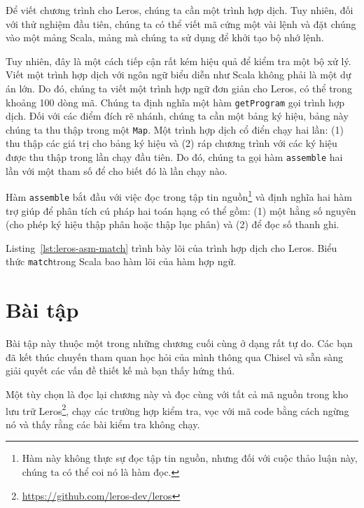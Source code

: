 \documentclass[%
    10pt,
    headinclude, footexclude,
    openright, %
    notitlepage,
    cleardoubleempty,
    headsepline,
    pointlessnumbers,
    bibtotoc, idxtotoc,
    ]{scrbook}
\newcommand{\code}[1]{{\small{\texttt{#1}}}}
\newcommand{\todo}[1]{{\emph{TODO: #1}}}
\newcommand{\myref}[2]{\href{#1}{#2}}
\renewcommand{\myref}[2]{{#2}{\footnote{\url{#1}}}}
\renewcommand{\todo}[1]{}
\begin{document}

Để viết chương trình cho Leros, chúng ta cần một trình hợp dịch. Tuy nhiên, đối với thử nghiệm đầu tiên, chúng ta có thể viết mã cứng một vài lệnh và đặt chúng vào một mảng Scala, mảng mà chúng ta sử dụng để khởi tạo bộ nhớ lệnh. 


\noindent Tuy nhiên, đây là một cách tiếp cận rất kém hiệu quả để kiểm tra một bộ xử lý. Viết một trình hợp dịch với ngôn ngữ biểu diễn như Scala không phải là một dự án lớn. Do đó, chúng ta viết một trình hợp ngữ đơn giản cho Leros, có thể trong khoảng 100 dòng mã. Chúng ta định nghĩa một hàm \code{getProgram} gọi trình hợp dịch. Đối với các điểm đích rẽ nhánh, chúng ta cần một bảng ký hiệu, bảng này chúng ta thu thập trong một \code{Map}. Một trình hợp dịch cổ điển chạy hai lần: (1) thu thập các giá trị cho bảng ký hiệu và (2) ráp chương trình với các ký hiệu được thu thập trong lần chạy đầu tiên. Do đó, chúng ta gọi hàm \code{assemble} hai lần với một tham số để cho biết đó là lần chạy nào. 


Hàm \code{assemble} bắt đầu với việc đọc trong tập tin nguồn\footnote{Hàm này không thực sự đọc tập tin nguồn, nhưng đối với cuộc thảo luận này, chúng ta có thể coi nó là hàm đọc.} và định nghĩa hai hàm trợ giúp để phân tích cú pháp hai toán hạng có thể gồm: (1) một hằng số nguyên (cho phép ký hiệu thập phân hoặc thập lục phân) và (2) để đọc số thanh ghi. 


Listing~\ref{lst:leros-asm-match} trình bày lõi của trình hợp dịch cho Leros. Biểu thức \code{match}trong Scala bao hàm lõi của hàm hợp ngữ. 

\todo{Some more words on the code.}


\section{Bài tập}

Bài tập này thuộc một trong những chương cuối cùng ở dạng rất tự do. Các bạn đã kết thúc chuyến tham quan học hỏi của mình thông qua Chisel và sẵn sàng giải quyết các vấn đề thiết kế mà bạn thấy hứng thú.

Một tùy chọn là đọc lại chương này và đọc cùng với tất cả mã nguồn trong \myref{https://github.com/leros-dev/leros}{kho lưu trữ Leros}, chạy các trường hợp kiểm tra, vọc với mã code bằng cách ngừng nó và thấy rằng các bài kiểm tra không chạy.
\end{document}
